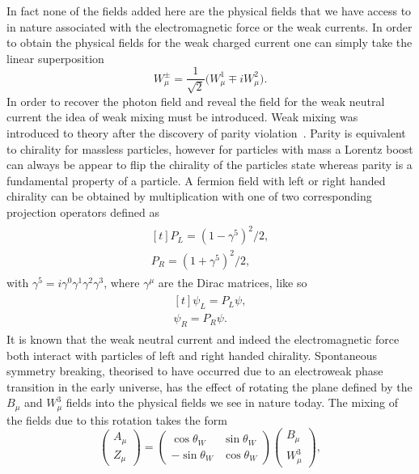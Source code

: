 In fact none of the fields added here are the physical fields that we have
access to in nature associated with the electromagnetic force or the weak
currents. In order to obtain the physical fields for the weak charged current
one can simply take the linear superposition
\begin{equation}
  \label{eq:weak-charged-current}
  W_\mu^\pm = \frac{1}{\sqrt{2}}\big(W_\mu^{1} \mp iW_\mu^2\big).
\end{equation}
In order to recover the photon field and reveal the field for the weak neutral
current the idea of weak mixing must be introduced. Weak mixing was introduced
to theory after the discovery of parity violation~\cite{wu-parity}. Parity is
equivalent to chirality for massless particles, however for particles with mass
a Lorentz boost can always be appear to flip the chirality of the particles
state whereas parity is a fundamental property of a particle. A fermion field
with left or right handed chirality can be obtained by multiplication with one
of two corresponding projection operators defined as
\begin{equation}
  \begin{split}
    \begin{aligned}[t]
      P_L = {(1 - \gamma^{5})}^{2} / 2, \\
      P_R = {(1 + \gamma^{5})}^{2} / 2,
    \end{aligned}
  \end{split}
\end{equation}
with $\gamma^{5} = i\gamma^{0}\gamma^{1}\gamma^{2}\gamma^{3}$, where
$\gamma^{\mu}$ are the Dirac matrices, like so
\begin{equation}
  \label{eq:chiral-fermions}
  \begin{split}
    \begin{aligned}[t]
      \psi_{L} = P_{L}\psi,\\
      \psi_{R} = P_{R}\psi.
    \end{aligned}
  \end{split}
\end{equation}
It is known that the weak neutral current and indeed the electromagnetic force
both interact with particles of left and right handed chirality. Spontaneous
symmetry breaking, theorised to have occurred due to an electroweak phase
transition in the early universe, has the effect of rotating the plane defined
by the $B_\mu$ and $W_\mu^3$ fields into the physical fields we see in nature
today. The mixing of the fields due to this rotation takes the form
\begin{equation}
  \label{eq:ew-mixing}
  \begin{pmatrix}
    A_\mu \\
    Z_\mu
  \end{pmatrix}
  =
  \begin{pmatrix}
    \cos{\theta_W} & \sin{\theta_W} \\
    -\sin{\theta_W} & \cos{\theta_W}
  \end{pmatrix}
  \begin{pmatrix}
    B_\mu \\
    W_\mu^3
  \end{pmatrix},
\end{equation}
